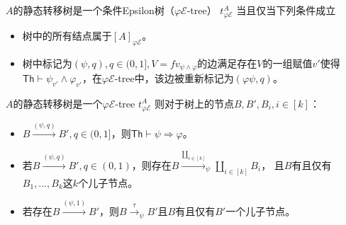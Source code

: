 \begin{definition}
   $A$的静态转移树是一个条件Epsilon树（$\varphi \mathcal{E}$-tree） $t^A_{\varphi \mathcal{E}}$ 
当且仅当下列条件成立
\begin{itemize}
   \item 树中的所有结点属于$[A]_{\varphi \mathcal{E}}$。
   \item 树中标记为$(\psi, q),q\in(0,1],V=fv_{\psi\wedge\varphi}$的边满足存在$V$的一组赋值$v'$使得$\mathsf{Th}\vdash \psi_{v'}\wedge\varphi_{v'}$，在$\varphi\mathcal{E}$-tree中，该边被重新标记为$(\varphi\psi,q)$。
\end{itemize}
\end{definition}

\begin{corollary}
   $A$的静态转移树是一个$\varphi \mathcal{E}$-tree $t^A_{\varphi \mathcal{E}}$ 则对于树上的节点$B,B',B_i,i\in [k]$：
   \begin{itemize}
      \item {
         $B\stackrel{(\psi,q)}{\rightarrow}B',q\in(0,1]$，则$\mathsf{Th}\vdash\psi\Rightarrow\varphi$。
      }
      \item {
         若$B\stackrel{(\psi,q)}{\rightarrow}B',q\in (0,1)$，则存在$B\stackrel{\coprod_{i\in [k]}}{\longrightarrow}_{\psi} \coprod_{i\in [k]} B_i$，
         且$B$有且仅有$B_1,\dots, B_k$这$k$个儿子节点。
      }
      \item {
         若存在$B\stackrel{(\psi,1)}{\rightarrow}B'$，则$B\stackrel{\tau}{\rightarrow}_{\psi}B'$且$B$有且仅有$B'$一个儿子节点。
      }
   \end{itemize}
\end{corollary}

